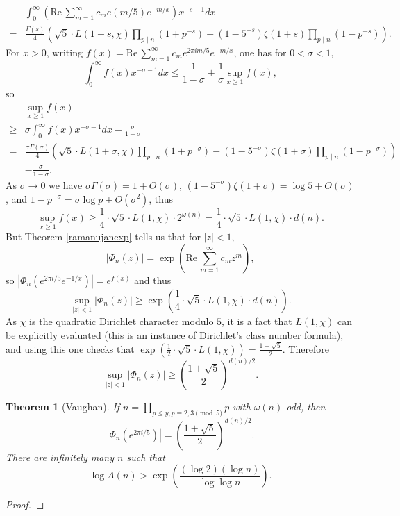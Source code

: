 \documentclass{article}
\def\Re{\ensuremath{\mathrm{Re}}\,}
\newtheorem{theorem}{Theorem}
\theoremstyle{definition}
\begin{document}
\[
\begin{split}
&\int_0^\infty \left( \Re \sum_{m=1}^\infty c_m e(m/5) e^{-m/x} \right) x^{-s-1} dx\\
=&\frac{\Gamma(s)}{4} \left( \sqrt{5} \cdot L(1+s,\chi)  \prod_{p \mid n} (1+p^{-s})
-(1- 5^{-s}) \zeta(1+s)   \prod_{p \mid n} (1-p^{-s}) \right).
\end{split}
\]
For $x>0$, writing $f(x) = \Re \sum_{m=1}^\infty c_m e^{2\pi im/5} e^{-m/x}$,
one has for $0<\sigma<1$,
\[
\int_0^\infty f(x) x^{-\sigma-1} dx \leq \frac{1}{1-\sigma} +  \frac{1}{\sigma} \sup_{x \geq 1} f(x),
\]
so
\[
\begin{split}
&\sup_{x \geq 1} f(x)\\
\geq &\sigma \int_0^\infty f(x) x^{-\sigma-1} dx - \frac{\sigma}{1-\sigma}\\
=&\frac{\sigma\Gamma(\sigma)}{4} \left( \sqrt{5} \cdot L(1+\sigma,\chi)  \prod_{p \mid n} (1+p^{-\sigma})
-(1- 5^{-\sigma}) \zeta(1+\sigma)   \prod_{p \mid n} (1-p^{-\sigma}) \right)\\
& - \frac{\sigma}{1-\sigma}.
\end{split}
\]
As $\sigma \to 0$ we have $\sigma \Gamma(\sigma) = 1+O(\sigma)$, $(1-5^{-\sigma})\zeta(1+\sigma) = \log 5 + O(\sigma)$, and
$1-p^{-\sigma} = \sigma \log p+O(\sigma^2)$, thus
\[
\sup_{x \geq 1} f(x) \geq \frac{1}{4} \cdot \sqrt{5} \cdot L(1,\chi) \cdot 2^{\omega(n)}= \frac{1}{4} \cdot \sqrt{5} \cdot L(1,\chi) \cdot d(n).
\]
But  Theorem \ref{ramanujanexp} tells us that for $|z|<1$,
\[
|\Phi_n(z)| = \exp\left( \Re \sum_{m=1}^\infty c_m z^m\right),
\]
so $|\Phi_n(e^{2\pi i/5} e^{-1/x})| = e^{f(x)}$ and thus
\[
\sup_{|z|<1} |\Phi_n(z)| \geq \exp\left( \frac{1}{4} \cdot \sqrt{5} \cdot L(1,\chi) \cdot d(n) \right).
\]
As $\chi$ is the quadratic Dirichlet character modulo $5$, it is a fact that
$L(1,\chi)$ can be explicitly evaluated (this is an instance of Dirichlet's class number formula),
and using this one checks
that $\exp\left( \frac{1}{2} \cdot \sqrt{5} \cdot L(1,\chi)\right) = \frac{1+\sqrt{5}}{2}$.
Therefore
\[
\sup_{|z|<1} |\Phi_n(z)| \geq \left( \frac{1+\sqrt{5}}{2}\right)^{d(n)/2}.
\]


\begin{theorem}[Vaughan]
If $n=\prod_{p \leq y, p \equiv 2,3 \pmod{5}} p$ with $\omega(n)$  odd, then
\[
|\Phi_n(e^{2\pi i/5})| = \left( \frac{1+\sqrt{5}}{2} \right)^{d(n)/2}.
\]
There are infinitely many $n$ such that 
\[
\log A(n) > \exp\left( \frac{(\log 2)(\log n)}{\log \log n}\right).
\]
\end{theorem}
\begin{proof}


\end{proof}
\end{document}

